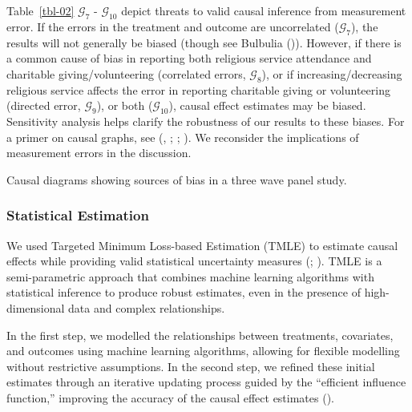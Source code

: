 \documentclass[
  single column]{article}
\begin{document}
Table~\ref{tbl-02} \(\mathcal{G}_7\) - \(\mathcal{G}_{10}\) depict
threats to valid causal inference from measurement error. If the errors
in the treatment and outcome are uncorrelated (\(\mathcal{G}_7\)), the
results will not generally be biased (though see Bulbulia
()). However, if there is a
common cause of bias in reporting both religious service attendance and
charitable giving/volunteering (correlated errors, \(\mathcal{G}_8\)),
or if increasing/decreasing religious service affects the error in
reporting charitable giving or volunteering (directed error,
\(\mathcal{G}_9\)), or both (\(\mathcal{G}_{10}\)), causal effect
estimates may be biased. Sensitivity analysis helps clarify the
robustness of our results to these biases. For a primer on causal
graphs, see (,
;
;
). We reconsider the
implications of measurement errors in the discussion.

\begin{table}

\caption{\label{tbl-02}Causal diagrams showing sources of bias in a
three wave panel study.}

\centering{

\threewavepaneltwo

}

\end{table}%

\subsubsection{Statistical Estimation}\label{statistical-estimation}

We used Targeted Minimum Loss-based Estimation (TMLE) to estimate causal
effects while providing valid statistical uncertainty measures
(;
). TMLE is a
semi-parametric approach that combines machine learning algorithms with
statistical inference to produce robust estimates, even in the presence
of high-dimensional data and complex relationships.

In the first step, we modelled the relationships between treatments,
covariates, and outcomes using machine learning algorithms, allowing for
flexible modelling without restrictive assumptions. In the second step,
we refined these initial estimates through an iterative updating process
guided by the ``efficient influence function,'' improving the accuracy
of the causal effect estimates ().
\end{document}
